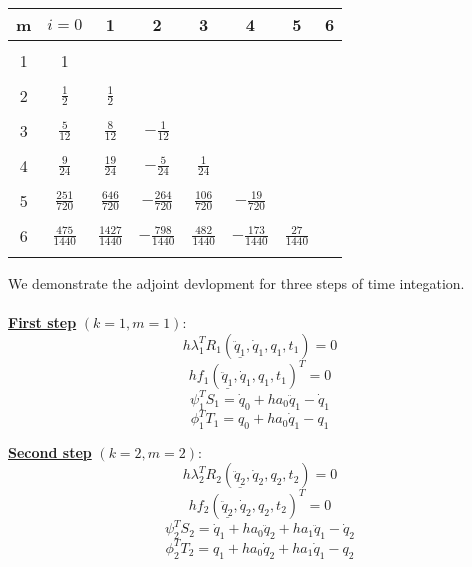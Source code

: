 \documentclass{beamer}
\begin{document}
\begin{frame}[allowframebreaks]
{    \begin{center}
      \begin{tabular}{cccccccc}
        \hline
        m & $i=0$ & 1 & 2 & 3 & 4 & 5 & 6 \\ 
        \hline
        &&&&&&&\\
        1 & 1     &   &   &   &   &   &  \\
        &&&&&&&\\
        2 & $\frac{1}{2}$ & $\frac{1}{2}$ &   &   &   &   &  \\
        &&&&&&&\\
        3 & $\frac{5}{12}$ & $\frac{8}{12}$ & $-\frac{1}{12}$  &   &   &   &  \\
        &&&&&&&\\
        4 & $\frac{9}{24}$ & $\frac{19}{24}$ & $-\frac{5}{24}$  & $\frac{1}{24}$  &   &   &  \\
        &&&&&&&\\
        5 & $\frac{251}{720}$ & $\frac{646}{720}$ & $-\frac{264}{720}$  & $\frac{106}{720}$  & $-\frac{19}{720}$  &   &  \\
        &&&&&&&\\
        6 & $\frac{475}{1440}$ & $\frac{1427}{1440}$ & $-\frac{798}{1440}$  & $\frac{482}{1440}$  & $-\frac{173}{1440}$  &  $\frac{27}{1440}$ &  \\
        &&&&&&&\\
        \hline   
      \end{tabular}
    \end{center}

    \framebreak

    We demonstrate the adjoint devlopment for three steps of time
    integation. \\
    ~\\
    \underline{\textbf{First step}} $(k=1, m=1)$: 
    $$ h \lambda_1^T R_1(\underline{\ddot{q}_1}, \dot{q}_1, q_1, t_1) = 0$$
    $$ h  f_1(\underline{\ddot{q}_1}, \dot{q}_1, q_1, t_1)^T = 0 $$
    $$ \psi_1^T S_1 = \dot{q}_{0}  + h a_0 \ddot{q}_{1} - \dot{q}_1  $$ 
    $$ \phi_1^T T_1 =  {q}_{0}  + h a_0 \dot{q}_{1} - {q}_1$$ 

    \underline{\textbf{Second step}} $(k=2, m=2)$: 
    $$h \lambda_2^T R_2(\underline{\ddot{q}_2}, \dot{q}_2, q_2, t_2) = 0$$
    $$h f_2(\underline{\ddot{q}_2}, \dot{q}_2, q_2, t_2)^T = 0$$
    $$ \psi_2^T S_2 = \dot{q}_{1}  + h a_0 \ddot{q}_{2} + h a_1 \ddot{q}_{1} - \dot{q}_2 $$ 
    $$ \phi_2^T T_2 = {q}_{1}  + h a_0 \dot{q}_{2}  + h a_1 \dot{q}_{1} - {q}_2$$ 

}
\end{frame}
\end{document}
